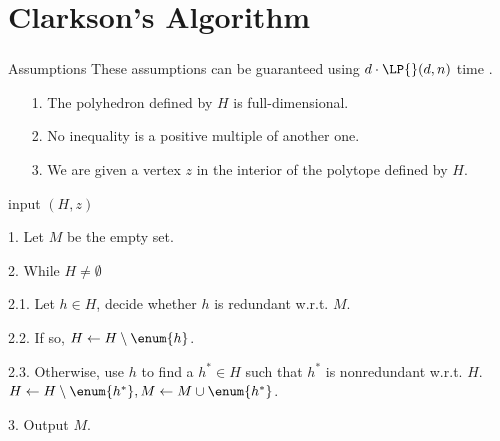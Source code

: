 \section{Clarkson's Algorithm}
\begin{frame}\frametitle{\insertsection}\justifying
\begin{ebox}{Assumptions}
These assumptions can be guaranteed using \(d\cdot\LP{}(d,n)\) time
\cite{fukuda:2015}.
\begin{itemize}
\item[{\color{SpringGreen4}1.}] The polyhedron defined by \(H\) is full-dimensional.
\item[{\color{SpringGreen4}2.}] No inequality is a positive multiple of another one.
\item[{\color{SpringGreen4}3.}] We are given a vertex \(z\) in the interior of the polytope defined by \(H\).
\end{itemize}
\end{ebox}
\pause
\begin{algo}
\item[input] \((H, z)\)
\item[1.] Let \(M\) be the empty set.
\item[2.] While \(H \neq \emptyset\)
\item[2.1.] Let \(h \in H\), decide whether \(h\) is redundant w.r.t. \(M\).
\item[2.2.] If so, \(H \gets H \setminus \enum{h}\).
\item[2.3.] Otherwise, use \(h\) to find a \(h^* \in H\) such that \(h^*\) is
nonredundant w.r.t. \(H\). \(H \gets H \setminus \enum{h^*}, M
\gets M \cup \enum{h^*}\).
\item[3.] Output \(M\).
\end{algo}
\end{frame}

